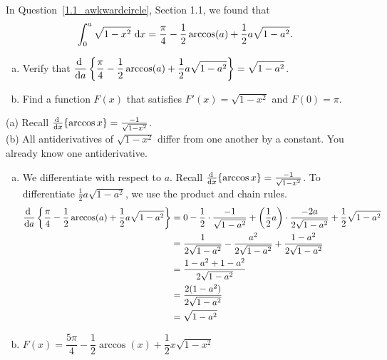 \begin{question} In Question~\ref{1.1_awkwardcircle}, Section 1.1, we found that
\[\int_0^a\sqrt{1-x^2}\ \dee{x}=\frac{\pi}{4} - \frac{1}{2}\arccos(a)+\frac{1}{2}a\sqrt{1-a^2}.\]
\begin{enumerate}[(a)]
\item Verify that $\displaystyle\diff{}{a}\left\{\frac{\pi}{4} - \frac{1}{2}\arccos(a)+\frac{1}{2}a\sqrt{1-a^2}\right\} = \sqrt{1-a^2}$.
\item Find a function $F(x)$ that satisfies $F'(x) = \sqrt{1-x^2}$ and $F(0)=\pi$.
\end{enumerate}
\end{question}
\begin{hint} (a) Recall $\diff{}{x}\{\arccos x\} = \frac{-1}{\sqrt{1-x^2}}$.\\
(b) All antiderivatives of $\sqrt{1-x^2}$ differ from one another by a constant. You already know one antiderivative.
\end{hint}
\begin{answer}
\begin{enumerate}[(a)]
\item We differentiate with respect to $a$. Recall $\diff{}{x}\{\arccos x\} = \frac{-1}{\sqrt{1-x^2}}$. To differentiate $\frac{1}{2}a\sqrt{1-a^2}$, we use the product and chain rules.
\begin{align*}
\diff{}{a}\left\{\frac{\pi}{4} - \frac{1}{2}\arccos(a)+\frac{1}{2}a\sqrt{1-a^2}\right\} &=
0-\frac{1}{2}\cdot\frac{-1}{\sqrt{1-a^2}} + \left(\frac{1}{2}a\right)\cdot\frac{-2a}{2\sqrt{1-a^2}} + \frac{1}{2}\sqrt{1-a^2}\\
&=\frac{1}{2\sqrt{1-a^2}}-
\frac{a^2}{2\sqrt{1-a^2}}+\frac{1-a^2}{2\sqrt{1-a^2}}\\
&=\frac{1-a^2+1-a^2}{2\sqrt{1-a^2}}\\
&=\frac{2(1-a^2)}{2\sqrt{1-a^2}}
\\&=\sqrt{1-a^2}
\end{align*}
\item $F(x) =  \dfrac{5\pi}{4}-\dfrac{1}{2}\arccos(x)+\dfrac{1}{2}x\sqrt{1-x^2}$
\end{enumerate}
\end{answer}

